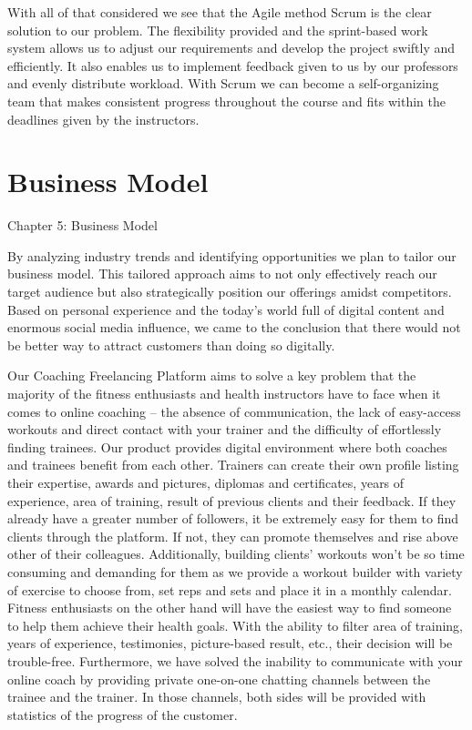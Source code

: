 \documentclass[12pt]{report}
\begin{document}
With all of that considered we see that the Agile method Scrum is the clear solution to our problem. The flexibility provided and the sprint-based work system allows us to adjust our requirements and develop the project swiftly and efficiently. It also enables us to implement feedback given to us by our professors and evenly distribute workload. With Scrum we can become a self-organizing team that makes consistent progress throughout the course and fits within the deadlines given by the instructors. 


\section{Business Model}
Chapter 5: Business Model 

By analyzing industry trends and identifying opportunities we plan to tailor our business model. This tailored approach aims to not only effectively reach our target audience but also strategically position our offerings amidst competitors. Based on personal experience and the today’s world full of digital content and enormous social media influence, we came to the conclusion that there would not be better way to attract customers than doing so digitally.

Our Coaching Freelancing Platform aims to solve a key problem that the majority of the fitness enthusiasts and health instructors have to face when it comes to online coaching – the absence of communication, the lack of easy-access workouts and direct contact with your trainer and the difficulty of effortlessly finding trainees. Our product provides digital environment where both coaches and trainees benefit from each other. Trainers can create their own profile listing their expertise, awards and pictures, diplomas and certificates, years of experience, area of training, result of previous clients and their feedback. If they already have a greater number of followers, it be extremely easy for them to find clients through the platform. If not, they can promote themselves and rise above other of their colleagues. Additionally, building clients’ workouts won’t be so time consuming and demanding for them as we provide a workout builder with variety of exercise to choose from, set reps and sets and place it in a monthly calendar. Fitness enthusiasts on the other hand will have the easiest way to find someone to help them achieve their health goals. With the ability to filter area of training, years of experience, testimonies, picture-based result, etc., their decision will be trouble-free. Furthermore, we have solved the inability to communicate with your online coach by providing private one-on-one chatting channels between the trainee and the trainer. In those channels, both sides will be provided with statistics of the progress of the customer.
\end{document}
